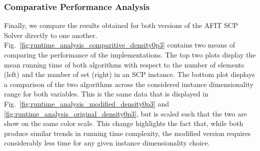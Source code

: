 \documentclass[12pt]{article}
\begin{document}
	\subsubsection{Comparative Performance Analysis}
	Finally, we compare the results obtained for both versions of the AFIT SCP Solver directly to one another. Fig.~\ref{fig:runtime_analysis_comparitive_density0p3} contains two means of comparing the performance of the implementations. The top two plots display the mean running time of both algorithms with respect to the number of elements (left) and the number of set (right) in an SCP instance. The bottom plot displays a comparison of the two algorithms across the considered instance dimensionality range for both variables. This is the same data that is displayed in Fig.~\ref{fig:runtime_analysis_modified_density0p3} and \ref{fig:runtime_analysis_original_density0p3}, but is scaled such that the two are show on the same color scale. This change highlights the fact that, while both produce similar trends in running time complexity, the modified version requires considerably less time for any given instance dimensionality choice.
\end{document}
